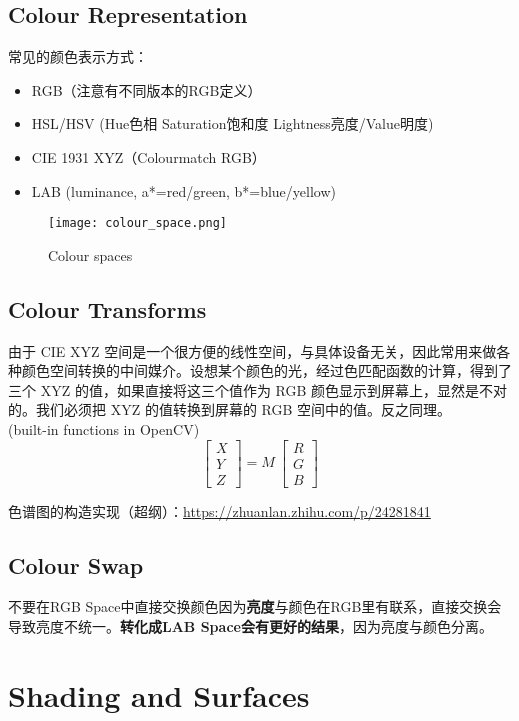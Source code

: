 \documentclass[11pt]{article}
\begin{document}
\subsection{Colour Representation}
常见的颜色表示方式：
\begin{itemize}
    \item RGB（注意有不同版本的RGB定义）
    \item HSL/HSV (Hue色相 Saturation饱和度 Lightness亮度/Value明度)
    \item CIE 1931 XYZ（Colourmatch RGB）
    \item LAB (luminance, a*=red/green, b*=blue/yellow)
\end{itemize}
\begin{figure}[hbt!]
    \centering
    \texttt{[image: colour\_space.png]}
    \caption{Colour spaces}
\end{figure}


\subsection{Colour Transforms}
由于 CIE XYZ 空间是一个很方便的线性空间，与具体设备无关，因此常用来做各种颜色空间转换的中间媒介。设想某个颜色的光，经过色匹配函数的计算，得到了三个 XYZ 的值，如果直接将这三个值作为 RGB 颜色显示到屏幕上，显然是不对的。我们必须把 XYZ 的值转换到屏幕的 RGB 空间中的值。反之同理。\\(built-in functions in OpenCV)
$$\left[\begin{matrix}X\\Y\\Z\end{matrix}\right]=M\ \left[\begin{matrix}R\\G\\B\end{matrix}\right]$$

\newpage
色谱图的构造实现（超纲）：\url{https://zhuanlan.zhihu.com/p/24281841}
\subsection{Colour Swap}
不要在RGB Space中直接交换颜色因为\textbf{亮度}与颜色在RGB里有联系，直接交换会导致亮度不统一。\textbf{转化成LAB Space会有更好的结果}，因为亮度与颜色分离。


\section{Shading and Surfaces}
\end{document}
